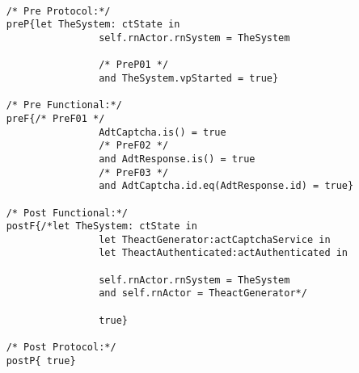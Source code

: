	\scriptsize
	\vspace{0.5cm}
	\begin{lstlisting}[style=MessirStyle,firstnumber=auto,captionpos=b,caption={\msrmessir (MCL-oriented) specification of the operation \emph{oeSendCaptcha}.},label=OM-actCaptchaService-oeSendCaptcha-MCL-LST]

	/* Pre Protocol:*/ 
	preP{let TheSystem: ctState in
					self.rnActor.rnSystem = TheSystem
	  
					/* PreP01 */
					and TheSystem.vpStarted = true}
	
	/* Pre Functional:*/
	preF{/* PreF01 */
					AdtCaptcha.is() = true
					/* PreF02 */
					and AdtResponse.is() = true
					/* PreF03 */
					and AdtCaptcha.id.eq(AdtResponse.id) = true}
	
	/* Post Functional:*/ 
	postF{/*let TheSystem: ctState in
					let TheactGenerator:actCaptchaService in
					let TheactAuthenticated:actAuthenticated in
					
					self.rnActor.rnSystem = TheSystem
					and self.rnActor = TheactGenerator*/
					
					true}
	
	/* Post Protocol:*/ 
	postP{ true}
	
	\end{lstlisting}
	\normalsize 
	
	
	
	





